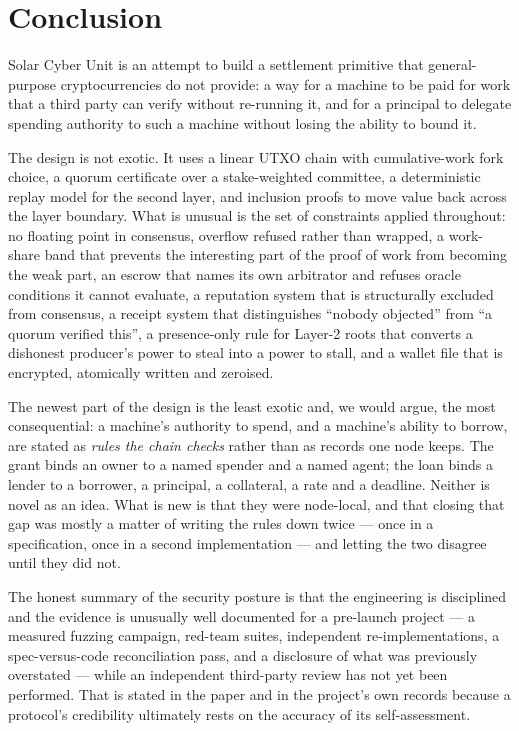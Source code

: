 \documentclass{article}
\begin{document}
\section{Conclusion}
\label{sec:conclusion}

Solar Cyber Unit is an attempt to build a settlement primitive that general-purpose
cryptocurrencies do not provide: a way for a machine to be paid for work that a
third party can verify without re-running it, and for a principal to delegate
spending authority to such a machine without losing the ability to bound it.

The design is not exotic. It uses a linear UTXO chain with cumulative-work
fork choice, a quorum certificate over a stake-weighted committee, a
deterministic replay model for the second layer, and inclusion proofs to move
value back across the layer boundary. What is unusual is the set of constraints
applied throughout: no floating point in consensus, overflow refused rather
than wrapped, a work-share band that prevents the interesting part of the
proof of work from becoming the weak part, an escrow that names its own
arbitrator and refuses oracle conditions it cannot evaluate, a reputation
system that is structurally excluded from consensus, a receipt system that
distinguishes ``nobody objected'' from ``a quorum verified this'', a
presence-only rule for Layer-2 roots that converts a dishonest producer's
power to steal into a power to stall, and a wallet file that is encrypted,
atomically written and zeroised.

The newest part of the design is the least exotic and, we would argue, the most
consequential: a machine's authority to spend, and a machine's ability to
borrow, are stated as \emph{rules the chain checks} rather than as records one
node keeps. The grant binds an owner to a named spender and a named agent; the
loan binds a lender to a borrower, a principal, a collateral, a rate and a
deadline. Neither is novel as an idea. What is new is that they were
node-local, and that closing that gap was mostly a matter of writing the rules
down twice --- once in a specification, once in a second implementation --- and
letting the two disagree until they did not.

The honest summary of the security posture is that the engineering is
disciplined and the evidence is unusually well documented for a pre-launch
project --- a measured fuzzing campaign, red-team suites, independent
re-implementations, a spec-versus-code reconciliation pass, and a
disclosure of what was previously overstated --- while an independent
third-party review has not yet been performed. That is stated in the paper and
in the project's own records because a protocol's credibility ultimately rests
on the accuracy of its self-assessment.
\end{document}
